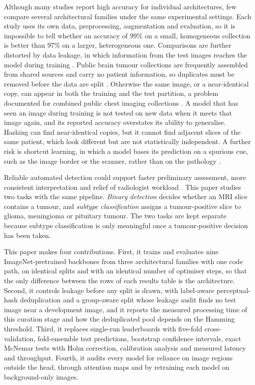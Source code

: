 \documentclass[a4paper,fleqn]{cas-sc}
\begin{document}
Although many studies report high accuracy for individual architectures, few compare several architectural families under the same experimental settings. Each study uses its own data, preprocessing, augmentation and evaluation, so it is impossible to tell whether an accuracy of 99\% on a small, homogeneous collection is better than 97\% on a larger, heterogeneous one. Comparisons are further distorted by data leakage, in which information from the test images reaches the model during training \citep{kapoor2023}. Public brain tumour collections are frequently assembled from shared sources and carry no patient information, so duplicates must be removed before the data are split \citep{fateh2026}. Otherwise the same image, or a near-identical copy, can appear in both the training and the test partition, a problem documented for combined public chest imaging collections \citep{roberts2021}. A model that has seen an image during training is not tested on new data when it meets that image again, and its reported accuracy overstates its ability to generalise. Hashing can find near-identical copies, but it cannot find adjacent slices of the same patient, which look different but are not statistically independent. A further risk is shortcut learning, in which a model bases its prediction on a spurious cue, such as the image border or the scanner, rather than on the pathology \citep{geirhos2020,zech2018,degrave2021}.

Reliable automated detection could support faster preliminary assessment, more consistent interpretation and relief of radiologist workload \citep{beam2018,defauw2018}. This paper studies two tasks with the same pipeline. \emph{Binary detection} decides whether an MRI slice contains a tumour, and \emph{subtype classification} assigns a tumour-positive slice to glioma, meningioma or pituitary tumour. The two tasks are kept separate because subtype classification is only meaningful once a tumour-positive decision has been taken.

This paper makes four contributions. First, it trains and evaluates nine ImageNet-pretrained backbones from three architectural families with one code path, on identical splits and with an identical number of optimiser steps, so that the only difference between the rows of each results table is the architecture. Second, it controls leakage before any split is drawn, with label-aware perceptual-hash deduplication and a group-aware split whose leakage audit finds no test image near a development image, and it reports the measured processing time of this curation stage and how the deduplicated pool depends on the Hamming threshold. Third, it replaces single-run leaderboards with five-fold cross-validation, fold-ensemble test predictions, bootstrap confidence intervals, exact McNemar tests with Holm correction, calibration analysis and measured latency and throughput. Fourth, it audits every model for reliance on image regions outside the head, through attention maps and by retraining each model on background-only images.
\end{document}
